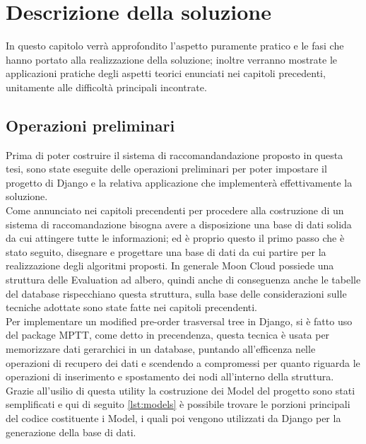 \chapter{Descrizione della soluzione}
\label{chp:04-solution}
In questo capitolo verrà approfondito l'aspetto puramente pratico e le fasi che hanno portato alla realizzazione della soluzione; 
inoltre verranno mostrate le applicazioni pratiche degli aspetti teorici enunciati nei capitoli precedenti, unitamente alle difficoltà 
principali incontrate.

\section{Operazioni preliminari}
Prima di poter costruire il sistema di raccomandandazione proposto in questa tesi, sono state eseguite delle operazioni preliminari
per poter impostare il progetto di Django e la relativa applicazione che implementerà effettivamente la soluzione.\\

Come annunciato nei capitoli precendenti per procedere alla costruzione di un sistema di raccomandazione bisogna avere a disposizione
una base di dati solida da cui attingere tutte le informazioni; ed è proprio questo il primo passo che è stato seguito, disegnare 
e progettare una base di dati da cui partire per la realizzazione degli algoritmi proposti.
In generale Moon Cloud possiede una struttura delle Evaluation ad albero, quindi anche di conseguenza anche le tabelle del database 
rispecchiano questa struttura, sulla base delle considerazioni sulle tecniche adottate sono state fatte nei capitoli precendenti.\\
Per implementare un modified pre-order trasversal tree in Django, si è fatto uso del package MPTT, come detto in precendenza, questa
tecnica è usata per memorizzare dati gerarchici in un database, puntando all'efficenza nelle operazioni di recupero dei dati e 
scendendo a compromessi per quanto riguarda le operazioni di inserimento e spostamento dei nodi all'interno della struttura.
Grazie all'usilio di questa utility la costruzione dei Model del progetto sono stati semplificati e qui di seguito \ref{lst:models}
è possibile trovare le porzioni principali del codice costituente i Model, i quali poi vengono utilizzati da Django per la 
generazione della base di dati. 

